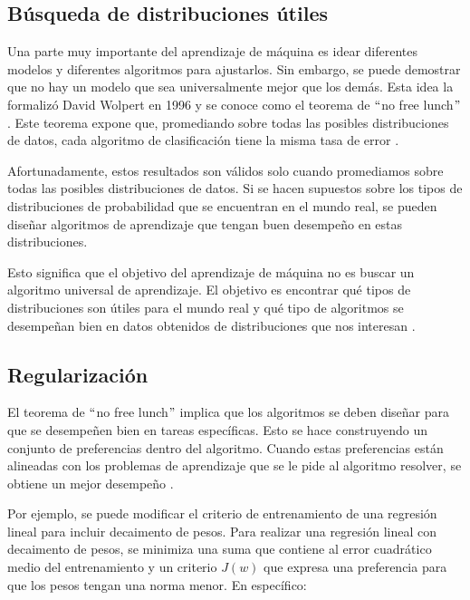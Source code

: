 \subsection{Búsqueda de distribuciones útiles}
Una parte muy importante del aprendizaje de máquina es idear diferentes modelos y diferentes algoritmos para ajustarlos. Sin embargo, se puede demostrar que no hay un modelo que sea universalmente mejor que los demás. Esta idea la formalizó David Wolpert en 1996 y se conoce como el teorema de $``$no free lunch$"$. Este teorema expone que, promediando sobre todas las posibles distribuciones de datos, cada algoritmo de clasificación tiene la misma tasa de error \cite{Murphy:2012:MLP:2380985} \cite{wolpert}.

\vspace{1em}

Afortunadamente, estos resultados son válidos solo cuando promediamos sobre todas las posibles distribuciones de datos. Si se hacen supuestos sobre los tipos de distribuciones de probabilidad que se encuentran en el mundo real, se pueden diseñar algoritmos de aprendizaje que tengan buen desempeño en estas distribuciones.

\vspace{1em}

Esto significa que el objetivo del aprendizaje de máquina no es buscar un algoritmo universal de aprendizaje. El objetivo es encontrar qué tipos de distribuciones son útiles para el mundo real y qué tipo de algoritmos se desempeñan bien en datos obtenidos de distribuciones que nos interesan \cite{goodfellow-et-al-2016}.

\subsection{Regularización}
El teorema de $``$no free lunch$"$ implica que los algoritmos se deben diseñar para que se desempeñen bien en tareas específicas. Esto se hace construyendo un conjunto de preferencias dentro del algoritmo. Cuando estas preferencias están alineadas con los problemas de aprendizaje que se le pide al algoritmo resolver, se obtiene un mejor desempeño \cite{goodfellow-et-al-2016}.

\vspace{1em}

Por ejemplo, se puede modificar el criterio de entrenamiento de una regresión lineal para incluir decaimento de pesos. Para realizar una regresión lineal con decaimento de pesos, se minimiza una suma que contiene al error cuadrático medio del entrenamiento y un criterio $J(w)$ que expresa una preferencia para que los pesos tengan una norma menor. En específico: 

